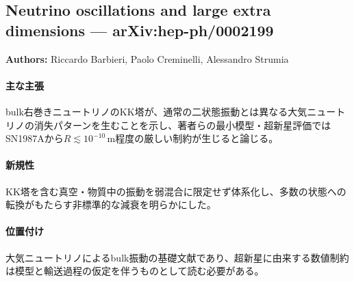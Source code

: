 \subsection{Neutrino oscillations and large extra dimensions --- arXiv:hep-ph/0002199}

\textbf{Authors:} Riccardo Barbieri, Paolo Creminelli, Alessandro Strumia

\paragraph{主な主張}
bulk右巻きニュートリノのKK塔が、通常の二状態振動とは異なる大気ニュートリノの消失パターンを生むことを示し、著者らの最小模型・超新星評価ではSN1987Aから$R\lesssim10^{-10}\,\mathrm{m}$程度の厳しい制約が生じると論じる\cite{Barbieri:2000BulkOscillations}。

\paragraph{新規性}
KK塔を含む真空・物質中の振動を弱混合に限定せず体系化し、多数の状態への転換がもたらす非標準的な減衰を明らかにした。

\paragraph{位置付け}
大気ニュートリノによるbulk振動の基礎文献であり、超新星に由来する数値制約は模型と輸送過程の仮定を伴うものとして読む必要がある。
